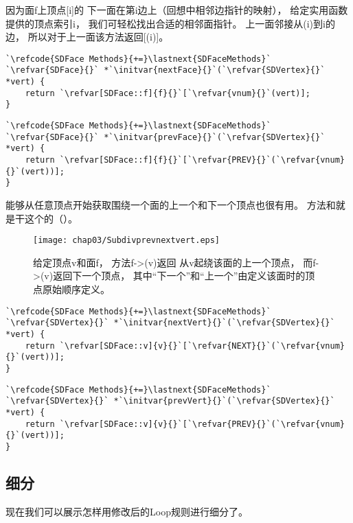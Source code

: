 因为面{\ttfamily f}上顶点{\ttfamily{}[i]}的
下一面在第i边上（回想中相邻边指针的映射），
给定实用函数提供的顶点索引{\ttfamily i}，
我们可轻松找出合适的相邻面指针。
上一面邻接从{\ttfamily{}(i)}到{\ttfamily i}的边，
所以对于上一面该方法返回{\ttfamily {}[(i)]}。
\begin{lstlisting}
`\refcode{SDFace Methods}{+=}\lastnext{SDFaceMethods}`
`\refvar{SDFace}{}` *`\initvar{nextFace}{}`(`\refvar{SDVertex}{}` *vert) {
    return `\refvar[SDFace::f]{f}{}`[`\refvar{vnum}{}`(vert)];
}
\end{lstlisting}
\begin{lstlisting}
`\refcode{SDFace Methods}{+=}\lastnext{SDFaceMethods}`
`\refvar{SDFace}{}` *`\initvar{prevFace}{}`(`\refvar{SDVertex}{}` *vert) {
    return `\refvar[SDFace::f]{f}{}`[`\refvar{PREV}{}`(`\refvar{vnum}{}`(vert))];
}
\end{lstlisting}

能够从任意顶点开始获取围绕一个面的上一个和下一个顶点也很有用。
方法和就是干这个的（）。
\begin{figure}[htbp]
    \centering\texttt{[image: chap03/Subdivprevnextvert.eps]}
    \caption{给定顶点{\ttfamily v}和面{\ttfamily f}，
    方法{\ttfamily f->\protect{}(v)}返回
    从{\ttfamily v}起绕该面的上一个顶点，
    而{\ttfamily f->\protect{}(v)}返回下一个顶点，
    其中“下一个”和“上一个”由定义该面时的顶点原始顺序定义。}
    \label{fig:3.31}
\end{figure}

\begin{lstlisting}
`\refcode{SDFace Methods}{+=}\lastnext{SDFaceMethods}`
`\refvar{SDVertex}{}` *`\initvar{nextVert}{}`(`\refvar{SDVertex}{}` *vert) {
    return `\refvar[SDFace::v]{v}{}`[`\refvar{NEXT}{}`(`\refvar{vnum}{}`(vert))];
}
\end{lstlisting}
\begin{lstlisting}
`\refcode{SDFace Methods}{+=}\lastnext{SDFaceMethods}`
`\refvar{SDVertex}{}` *`\initvar{prevVert}{}`(`\refvar{SDVertex}{}` *vert) {
    return `\refvar[SDFace::v]{v}{}`[`\refvar{PREV}{}`(`\refvar{vnum}{}`(vert))];
}
\end{lstlisting}

\subsection{细分}\label{sub:细分}
现在我们可以展示怎样用修改后的Loop规则进行细分了。